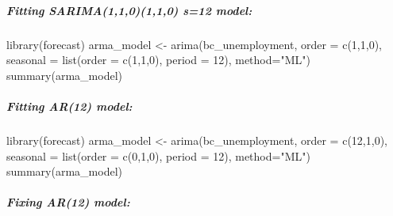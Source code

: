 \documentclass[
  letterpaper,
  DIV=11,
  numbers=noendperiod]{scrartcl}
\let\oldsubparagraph\subparagraph
\renewcommand{\subparagraph}[1]{\oldsubparagraph{#1}\mbox{}}
\newenvironment{Shaded}{\begin{snugshade}}{\end{snugshade}}
\newcommand{\AttributeTok}[1]{\textcolor[rgb]{0.40,0.45,0.13}{#1}}
\newcommand{\DecValTok}[1]{\textcolor[rgb]{0.68,0.00,0.00}{#1}}
\newcommand{\FunctionTok}[1]{\textcolor[rgb]{0.28,0.35,0.67}{#1}}
\newcommand{\NormalTok}[1]{\textcolor[rgb]{0.00,0.23,0.31}{#1}}
\newcommand{\OtherTok}[1]{\textcolor[rgb]{0.00,0.23,0.31}{#1}}
\newcommand{\StringTok}[1]{\textcolor[rgb]{0.13,0.47,0.30}{#1}}
\begin{document}
\hypertarget{fitting-sarima110110-s12-model}{%
\subparagraph{Fitting SARIMA(1,1,0)(1,1,0) s=12
model:}\label{fitting-sarima110110-s12-model}}

\begin{Shaded}
\begin{Highlighting}[]
\FunctionTok{library}\NormalTok{(forecast)}
\NormalTok{arma\_model }\OtherTok{\textless{}{-}} \FunctionTok{arima}\NormalTok{(bc\_unemployment, }\AttributeTok{order =} \FunctionTok{c}\NormalTok{(}\DecValTok{1}\NormalTok{,}\DecValTok{1}\NormalTok{,}\DecValTok{0}\NormalTok{), }\AttributeTok{seasonal =} \FunctionTok{list}\NormalTok{(}\AttributeTok{order =} \FunctionTok{c}\NormalTok{(}\DecValTok{1}\NormalTok{,}\DecValTok{1}\NormalTok{,}\DecValTok{0}\NormalTok{), }\AttributeTok{period =} \DecValTok{12}\NormalTok{), }\AttributeTok{method=}\StringTok{"ML"}\NormalTok{)}
\FunctionTok{summary}\NormalTok{(arma\_model)}
\end{Highlighting}
\end{Shaded}

\hypertarget{fitting-ar12-model}{%
\subparagraph{Fitting AR(12) model:}\label{fitting-ar12-model}}

\begin{Shaded}
\begin{Highlighting}[]
\FunctionTok{library}\NormalTok{(forecast)}
\NormalTok{arma\_model }\OtherTok{\textless{}{-}} \FunctionTok{arima}\NormalTok{(bc\_unemployment, }\AttributeTok{order =} \FunctionTok{c}\NormalTok{(}\DecValTok{12}\NormalTok{,}\DecValTok{1}\NormalTok{,}\DecValTok{0}\NormalTok{), }\AttributeTok{seasonal =} \FunctionTok{list}\NormalTok{(}\AttributeTok{order =} \FunctionTok{c}\NormalTok{(}\DecValTok{0}\NormalTok{,}\DecValTok{1}\NormalTok{,}\DecValTok{0}\NormalTok{), }\AttributeTok{period =} \DecValTok{12}\NormalTok{), }\AttributeTok{method=}\StringTok{"ML"}\NormalTok{)}
\FunctionTok{summary}\NormalTok{(arma\_model)}
\end{Highlighting}
\end{Shaded}

\hypertarget{fixing-ar12-model}{%
\subparagraph{Fixing AR(12) model:}\label{fixing-ar12-model}}
\end{document}
